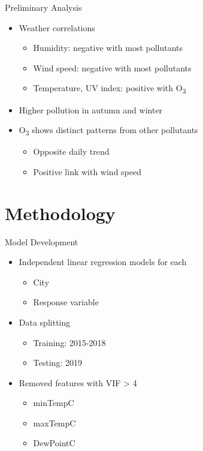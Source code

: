 \documentclass[svgnames, 12pt]{beamer}
\begin{document}
\begin{frame}{Preliminary Analysis}
    \begin{itemize}
       \item Weather correlations
           \begin{itemize}
               \item Humidity: negative with most pollutants
               \item Wind speed: negative with most pollutants
               \item Temperature, UV index: positive with O\textsubscript{3}
           \end{itemize}
       \item Higher pollution in autumn and winter
       \item O\textsubscript{3} shows distinct patterns from other pollutants
           \begin{itemize}
               \item Opposite daily trend
               \item Positive link with wind speed
           \end{itemize}
    \end{itemize}
\end{frame}

\section{Methodology}

\begin{frame}{Model Development}
\begin{itemize}
    \item Independent linear regression models for each
        \begin{itemize}
            \item City
            \item Response variable
        \end{itemize}
    \item Data splitting
        \begin{itemize}
            \item Training: 2015-2018
            \item Testing: 2019
        \end{itemize}
    \item Removed features with VIF > 4
        \begin{itemize}
            \item minTempC
            \item maxTempC
            \item DewPointC
        \end{itemize}
\end{itemize}
\end{frame}
\end{document}
